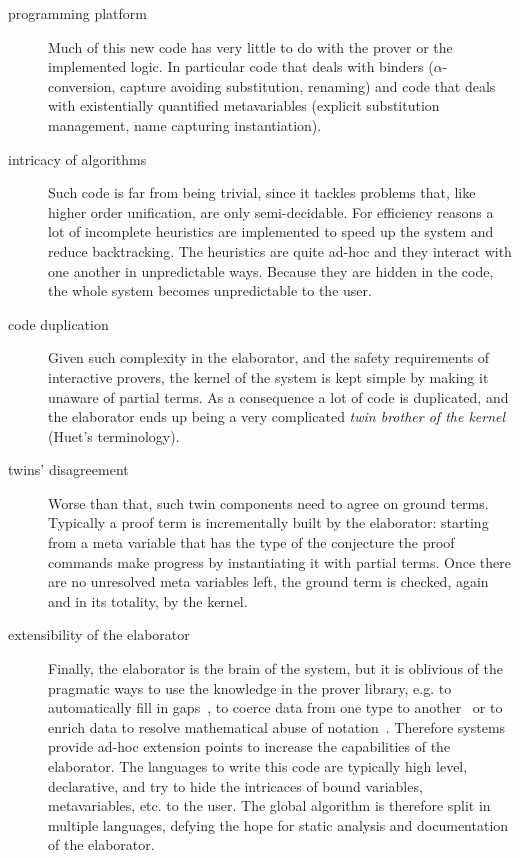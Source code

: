 \documentclass{easychair}
\begin{document}
\begin{description}
\item[programming platform]
Much of this new code has very little to do with the prover or the implemented
logic. In particular code that deals with binders ($\alpha$-conversion,
capture avoiding substitution, renaming) and code that deals with existentially
quantified metavariables (explicit substitution management, name capturing
instantiation).
\item[intricacy of algorithms]
Such code is far from being trivial, since it tackles problems that, like
higher order unification, are only semi-decidable. For efficiency reasons a lot
of incomplete heuristics are implemented to speed up the system and reduce
backtracking. The heuristics are quite ad-hoc and they interact with
one another in unpredictable ways. Because they are hidden in the code, the
whole system becomes unpredictable to the user.
\item[code duplication]
Given such complexity in the elaborator, and the safety requirements of interactive provers, the kernel of the system is kept simple by making it unaware of partial terms.  As a consequence a lot of code is duplicated, and
the elaborator ends up being a very complicated \emph{twin brother of the
kernel} (Huet's terminology).
\item[twins' disagreement]
Worse than that, such twin components need to agree on ground terms.
Typically a proof term is incrementally built by the elaborator:
starting from a meta variable that has the type of
the conjecture the proof commands make progress by instantiating it
with partial terms.  Once there are no unresolved meta variables left,
the ground term is checked, again and in its totality, by the kernel.
\item[extensibility of the elaborator]
Finally, the elaborator is the brain of the system, but it is oblivious of the
pragmatic ways to use the knowledge in the prover library, e.g.  to
automatically fill in gaps~\cite{oothm,unificationhints}, to coerce data from one type
to another~\cite{coercivesubtyping} or to enrich data to resolve mathematical
abuse of notation~\cite{nonuniformcoercions}. Therefore systems provide
ad-hoc extension points to increase the capabilities of the elaborator.  The
languages to write this code are typically high level, declarative, and
try to hide the intricaces of bound variables, metavariables, etc. to the user.
The global algorithm is therefore split in multiple languages, defying the hope
for static analysis and documentation of the elaborator.
\end{description}
\end{document}
